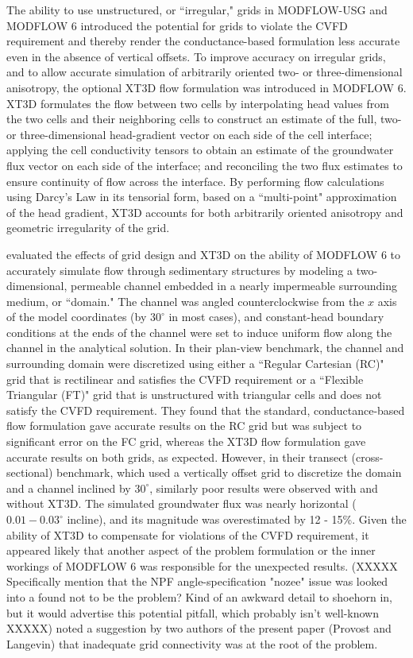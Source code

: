 \documentclass{article}
\begin{document}
The ability to use unstructured, or ``irregular," grids in MODFLOW-USG and MODFLOW 6 introduced the potential for grids to violate the CVFD requirement and thereby render the conductance-based formulation less accurate even in the absence of vertical offsets. To improve accuracy on irregular grids, and to allow accurate simulation of arbitrarily oriented two- or three-dimensional anisotropy, the optional XT3D flow formulation \citep{modflow6xt3d} was introduced in MODFLOW 6. XT3D formulates the flow between two cells by interpolating head values from the two cells and their neighboring cells to construct an estimate of the full, two- or three-dimensional head-gradient vector on each side of the cell interface; applying the cell conductivity tensors to obtain an estimate of the groundwater flux vector on each side of the interface; and reconciling the two flux estimates to ensure continuity of flow across the interface. By performing flow calculations using Darcy's Law in its tensorial form, based on a ``multi-point" approximation of the head gradient, XT3D accounts for both arbitrarily oriented anisotropy and geometric irregularity of the grid.

\cite{bardot2022} evaluated the effects of grid design and XT3D on the ability of MODFLOW 6 to accurately simulate flow through sedimentary structures by modeling a two-dimensional, permeable channel embedded in a nearly impermeable surrounding medium, or ``domain." The channel was angled counterclockwise from the $x$ axis of the model coordinates (by $30^{\circ}$ in most cases), and constant-head boundary conditions at the ends of the channel were set to induce uniform flow along the channel in the analytical solution. In their plan-view benchmark, the channel and surrounding domain were discretized using either a ``Regular Cartesian (RC)" grid that is rectilinear and satisfies the CVFD requirement or a ``Flexible Triangular (FT)" grid that is unstructured with triangular cells and does not satisfy the CVFD requirement. They found that the standard, conductance-based flow formulation gave accurate results on the RC grid but was subject to significant error on the FC grid, whereas the XT3D flow formulation gave accurate results on both grids, as expected. However, in their transect (cross-sectional) benchmark, which used a vertically offset grid to discretize the domain and a channel inclined by $30^{\circ}$, similarly poor results were observed with and without XT3D. The simulated groundwater flux was nearly horizontal ($0.01 - 0.03^{\circ}$ incline), and its magnitude was overestimated by 12 - 15\%. Given the ability of XT3D to compensate for violations of the CVFD requirement, it appeared likely that another aspect of the problem formulation or the inner workings of MODFLOW 6 was responsible for the unexpected results. (XXXXX Specifically mention that the NPF angle-specification "nozee" issue was looked into a found not to be the problem? Kind of an awkward detail to shoehorn in, but it would advertise this potential pitfall, which probably isn't well-known XXXXX) \cite{bardot2022} noted a suggestion by two authors of the present paper (Provost and Langevin) that inadequate grid connectivity was at the root of the problem.
\end{document}

